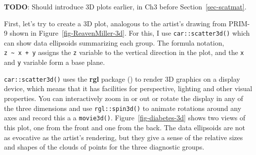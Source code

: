 \documentclass[
  letterpaper,
  10pt,
  krantz2]{krantz}
\makeatletter
\newenvironment{Shaded}{\begin{snugshade}}{\end{snugshade}}
\newcommand{\AttributeTok}[1]{\textcolor[rgb]{0.40,0.45,0.13}{#1}}
\newcommand{\ConstantTok}[1]{\textcolor[rgb]{0.56,0.35,0.01}{#1}}
\newcommand{\FunctionTok}[1]{\textcolor[rgb]{0.28,0.35,0.67}{#1}}
\newcommand{\NormalTok}[1]{\textcolor[rgb]{0.00,0.23,0.31}{#1}}
\newcommand{\OtherTok}[1]{\textcolor[rgb]{0.00,0.23,0.31}{#1}}
\newcommand{\SpecialCharTok}[1]{\textcolor[rgb]{0.37,0.37,0.37}{#1}}
\newcommand{\StringTok}[1]{\textcolor[rgb]{0.13,0.47,0.30}{#1}}
\newenvironment{kframe}{%
  \medskip{}
  \setlength{\fboxsep}{.8em}
  \def\at@end@of@kframe{}%
  \ifinner\ifhmode%
  \def\at@end@of@kframe{\end{minipage}}%
  \begin{minipage}{\columnwidth}%
  \fi\fi%
  \def\FrameCommand##1{\hskip\@totalleftmargin \hskip-\fboxsep
  \colorbox{shadecolor}{##1}\hskip-\fboxsep
      \hskip-\linewidth \hskip-\@totalleftmargin \hskip\columnwidth}%
  \MakeFramed {\advance\hsize-\width
    \@totalleftmargin\z@ \linewidth\hsize
    \@setminipage}}%
{\par\unskip\endMakeFramed%
  \at@end@of@kframe}
\renewenvironment{Shaded}{\begin{kframe}}{\end{kframe}}
\makeatother
\begin{document}
\textbf{TODO}: Should introduce 3D plots earlier, in Ch3 before
Section~\ref{sec-scatmat}.

First, let's try to create a 3D plot, analogous to the artist's drawing
from PRIM-9 shown in Figure~\ref{fig-ReavenMiller-3d}. For this, I use
\texttt{car::scatter3d()} which can show data ellipsoids summarizing
each group. The formula notation, \texttt{z\ \textasciitilde{}\ x\ +\ y}
assigns the \texttt{z} variable to the vertical direction in the plot,
and the \texttt{x} and \texttt{y} variable form a base plane.

\begin{Shaded}
\end{Shaded}

\texttt{car::scatter3d()} uses the \textbf{rgl} package
() to render 3D graphics on
a display device, which means that it has facilities for perspective,
lighting and other visual properties. You can interactively zoom in or
out or rotate the display in any of the three dimensions and use
\texttt{rgl::spin3d()} to animate rotations around any axes and record
this a a \texttt{movie3d()}. Figure~\ref{fig-diabetes-3d} shows two
views of this plot, one from the front and one from the back. The data
ellipsoids are not as evocative as the artist's rendering, but they give
a sense of the relative sizes and shapes of the clouds of points for the
three diagnostic groups.
\end{document}
